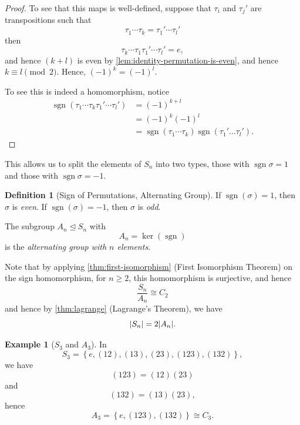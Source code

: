 \documentclass{article}
\theoremstyle{definition}
\newtheorem{definition}[theorem]{Definition}
\newtheorem*{example*}{Example}
\theoremstyle{remark}
\DeclarePairedDelimiter{\abs}{\lvert}{\rvert}
\newcommand{\pqty}[1]{\left(#1\right)}
\newcommand{\Bqty}[1]{\left\{#1\right\}}
\newcommand{\flatfrac}[2]{\frac{#1}{#2}}
\newcommand{\perm}[1]{(#1)}
\newcommand{\isomorphic}{\cong}
\newcommand{\normalsub}{\trianglelefteq}
\newcommand{\sign}{\operatorname{sgn}}
\begin{document}
\begin{proof}
    To see that this maps is well-defined, suppose that \(\tau_i\) and \(\tau_j'\) are transpositions such that
    \[
        \tau_1 \cdots \tau_k = \tau_1' \cdots \tau_l'
    \]
    then
    \[
        \tau_k \cdots \tau_1 \tau_1' \cdots \tau_l' = e,
    \]
    and hence \(\pqty{k + l}\) is even by \autoref{lem:identity-permutation-is-even}, and hence \(k \equiv l \pmod{2}\). Hence, \(\pqty{-1}^k = \pqty{-1}^l\).

    To see this is indeed a homomorphism, notice
    \begin{align*}
        \sign\pqty{\tau_1 \cdots \tau_k \tau_1' \cdots \tau_l'} &= \pqty{-1}^{k + l} \\
        &= \pqty{-1}^k \pqty{-1}^l \\
        &= \sign\pqty{\tau_1 \cdots \tau_k} \sign\pqty{\tau_1' \dots \tau_l'}.
    \end{align*}
\end{proof}

This allows us to split the elements of \(S_n\) into two types, those with \(\sign \sigma = 1\) and those with \(\sign \sigma = -1\).

\begin{definition}[Sign of Permutations, Alternating Group]
    \label{def:sign-permutation-alternating-group}%
    If \(\sign\pqty{\sigma} = 1\), then \(\sigma\) is \emph{even}. If \(\sign\pqty{\sigma} = -1\), then \(\sigma\) is \emph{odd}.

    The subgroup \(A_n \normalsub S_n\) with
    \[
        A_n = \ker\pqty{\sign}
    \]
    is the \emph{alternating group with \(n\) elements}.
\end{definition}

Note that by applying \autoref{thm:first-isomorphism} (First Isomorphism Theorem) on the sign homomorphism, for \(n \geq 2\), this homomorphism is surjective, and hence
\[
    \flatfrac{S_n}{A_n} \isomorphic C_2
\]
and hence by \autoref{thm:lagrange} (Lagrange's Theorem), we have
\[
    \abs{S_n} = 2 \abs{A_n}.
\]

\begin{example*}[\(S_3\) and \(A_3\)]
    In
    \[
        S_3 = \Bqty{e, \perm{12}, \perm{13}, \perm{23}, \perm{123}, \perm{132}},
    \]
    we have
    \[
        \perm{123} = \perm{12} \perm{23}
    \]
    and
    \[
        \perm{132} = \perm{13} \perm{23},
    \]
    hence
    \[
        A_3 = \Bqty{e, \perm{123}, \perm{132}} \isomorphic C_3.
    \]
\end{example*}
\end{document}
